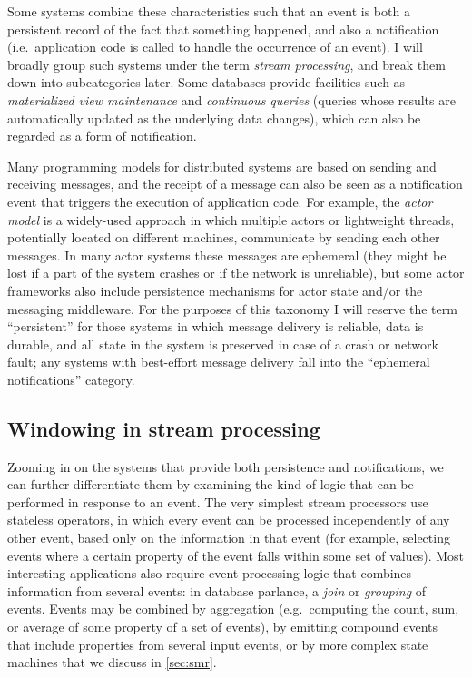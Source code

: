 \documentclass[sigconf,nonacm]{acmart}
\begin{document}
Some systems combine these characteristics such that an event is both a persistent record of the fact that something happened, and also a notification (i.e.\ application code is called to handle the occurrence of an event).
I will broadly group such systems under the term \emph{stream processing}, and break them down into subcategories later.
Some databases provide facilities such as \emph{materialized view maintenance} and \emph{continuous queries} (queries whose results are automatically updated as the underlying data changes), which can also be regarded as a form of notification.

Many programming models for distributed systems are based on sending and receiving messages, and the receipt of a message can also be seen as a notification event that triggers the execution of application code.
For example, the \emph{actor model} is a widely-used approach in which multiple actors or lightweight threads, potentially located on different machines, communicate by sending each other messages.
In many actor systems these messages are ephemeral (they might be lost if a part of the system crashes or if the network is unreliable), but some actor frameworks also include persistence mechanisms for actor state and/or the messaging middleware.
For the purposes of this taxonomy I will reserve the term ``persistent'' for those systems in which message delivery is reliable, data is durable, and all state in the system is preserved in case of a crash or network fault; any systems with best-effort message delivery fall into the ``ephemeral notifications'' category.

\subsection{Windowing in stream processing}\label{sec:windowing}

Zooming in on the systems that provide both persistence and notifications, we can further differentiate them by examining the kind of logic that can be performed in response to an event.
The very simplest stream processors use stateless operators, in which every event can be processed independently of any other event, based only on the information in that event (for example, selecting events where a certain property of the event falls within some set of values).
Most interesting applications also require event processing logic that combines information from several events: in database parlance, a \emph{join} or \emph{grouping} of events.
Events may be combined by aggregation (e.g.\ computing the count, sum, or average of some property of a set of events), by emitting compound events that include properties from several input events, or by more complex state machines that we discuss in \autoref{sec:smr}.
\end{document}
